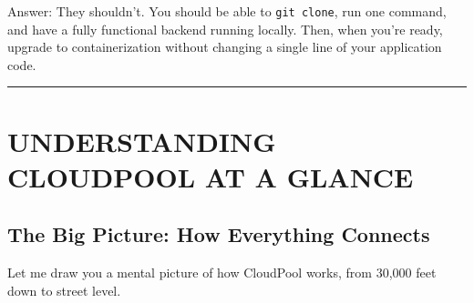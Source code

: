 \documentclass[11pt,a4paper]{report}
\begin{document}
Answer: They shouldn't. You should be able to \texttt{git clone}, run one command, and have a fully functional backend running locally. Then, when you're ready, upgrade to containerization without changing a single line of your application code.


\vfill\hrule\vfill



\part{UNDERSTANDING CLOUDPOOL AT A GLANCE}



\chapter{The Big Picture: How Everything Connects}


Let me draw you a mental picture of how CloudPool works, from 30,000 feet down to street level.
\end{document}
